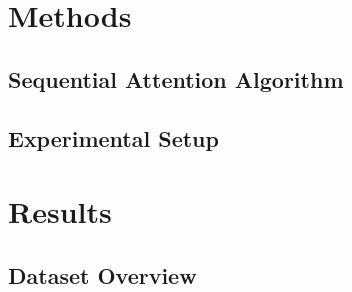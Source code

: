 \documentclass[a4paper,twocolumn]{article} %
\begin{document}
\section{Methods}
\subsection{Sequential Attention Algorithm}



\subsection{Experimental Setup}

\section{Results}
\subsection{Dataset Overview}
\end{document}
